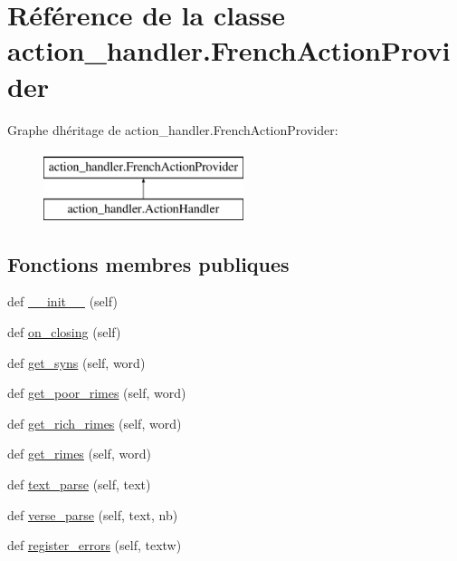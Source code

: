 \hypertarget{classaction__handler_1_1_french_action_provider}{}\section{Référence de la classe action\+\_\+handler.\+French\+Action\+Provider}
\label{classaction__handler_1_1_french_action_provider}
Graphe d\textquotesingle{}héritage de action\+\_\+handler.\+French\+Action\+Provider\+:\begin{figure}[H]
\begin{center}
\leavevmode
\includegraphics[height=2.000000cm]{classaction__handler_1_1_french_action_provider}
\end{center}
\end{figure}
\subsection*{Fonctions membres publiques}
\begin{DoxyCompactItemize}
\item 
def \hyperlink{classaction__handler_1_1_french_action_provider_a52e8f6c46f3e5ee688e6ddca207be4f2}{\+\_\+\+\_\+init\+\_\+\+\_\+} (self)
\item 
def \hyperlink{classaction__handler_1_1_french_action_provider_aa3ba3910751f9e706fa6e0244e89bd7b}{on\+\_\+closing} (self)
\item 
def \hyperlink{classaction__handler_1_1_french_action_provider_adf30161ac1efb5b203ba60a106c6bbc3}{get\+\_\+syns} (self, word)
\item 
def \hyperlink{classaction__handler_1_1_french_action_provider_a2abf94c2760e6855cde9c721680094c2}{get\+\_\+poor\+\_\+rimes} (self, word)
\item 
def \hyperlink{classaction__handler_1_1_french_action_provider_a2e813bf6fd1b110da8be8da47f966a23}{get\+\_\+rich\+\_\+rimes} (self, word)
\item 
def \hyperlink{classaction__handler_1_1_french_action_provider_a5fd86eb57a9312e8fa50f97f667da4b3}{get\+\_\+rimes} (self, word)
\item 
def \hyperlink{classaction__handler_1_1_french_action_provider_aee3f99571d3e6ac07f28eb39fc3cdeb7}{text\+\_\+parse} (self, text)
\item 
def \hyperlink{classaction__handler_1_1_french_action_provider_a283b0319dda1e8f63fcbd2cd6d2ce6f3}{verse\+\_\+parse} (self, text, nb)
\item 
def \hyperlink{classaction__handler_1_1_french_action_provider_ad6533993471604b01b18782f58c1fe0d}{register\+\_\+errors} (self, textw)
\end{DoxyCompactItemize}
